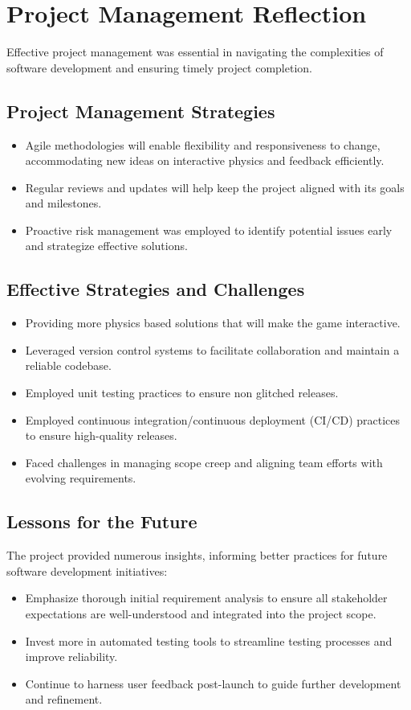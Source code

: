 \documentclass[12pt]{article}
\begin{document}
\section{Project Management Reflection}
Effective project management was essential in navigating the complexities of software development and ensuring timely project completion.

\subsection{Project Management Strategies}
\begin{itemize}
    \item Agile methodologies will enable flexibility and responsiveness to change, accommodating new ideas on interactive physics and feedback efficiently.
    \item Regular reviews and updates will help keep the project aligned with its goals and milestones.
    \item Proactive risk management was employed to identify potential issues early and strategize effective solutions.
\end{itemize}

\subsection{Effective Strategies and Challenges}
\begin{itemize}
    \item Providing more physics based solutions that will make the game interactive.
    \item Leveraged version control systems to facilitate collaboration and maintain a reliable codebase.
    \item Employed unit testing practices to ensure non glitched releases.
    \item Employed continuous integration/continuous deployment (CI/CD) practices to ensure high-quality releases.
    \item Faced challenges in managing scope creep and aligning team efforts with evolving requirements.
\end{itemize}

\subsection{Lessons for the Future}
The project provided numerous insights, informing better practices for future software development initiatives:
\begin{itemize}
    \item Emphasize thorough initial requirement analysis to ensure all stakeholder expectations are well-understood and integrated into the project scope.
    \item Invest more in automated testing tools to streamline testing processes and improve reliability.
    \item Continue to harness user feedback post-launch to guide further development and refinement.
\end{itemize}
\end{document}

